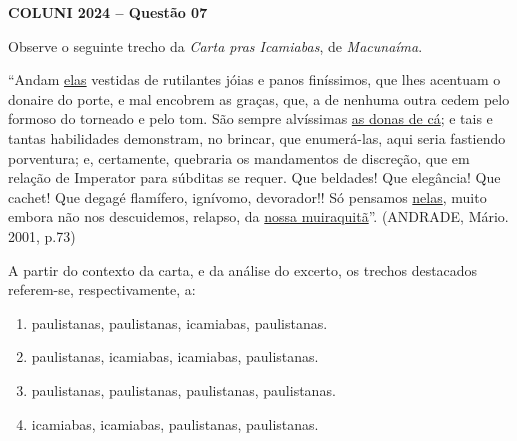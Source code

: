 \textbf{COLUNI 2024 -- Questão 07}\par\medskip Observe o seguinte trecho da \textit{Carta pras Icamiabas}, de \textit{Macunaíma}.

\par

“Andam \underline{elas} vestidas de rutilantes jóias e panos finíssimos, que lhes acentuam o donaire do porte, e mal encobrem as graças, que, a de nenhuma outra cedem pelo formoso do torneado e pelo tom. São sempre alvíssimas \underline{as donas de cá}; e tais e tantas habilidades demonstram, no brincar, que enumerá-las, aqui seria fastiendo porventura; e, certamente, quebraria os mandamentos de discreção, que em relação de Imperator para súbditas se requer. Que beldades! Que elegância! Que cachet! Que degagé flamífero, ignívomo, devorador!! Só pensamos \underline{nelas}, muito embora não nos descuidemos, relapso, da \underline{nossa muiraquitã}”. (ANDRADE, Mário. 2001, p.73)

\par

A partir do contexto da carta, e da análise do excerto, os trechos destacados referem-se, respectivamente, a:\begin{enumerate}
\item paulistanas, paulistanas, icamiabas, paulistanas.
\item paulistanas, icamiabas, icamiabas, paulistanas.
\item paulistanas, paulistanas, paulistanas, paulistanas.
\item icamiabas, icamiabas, paulistanas, paulistanas.\end{enumerate}
